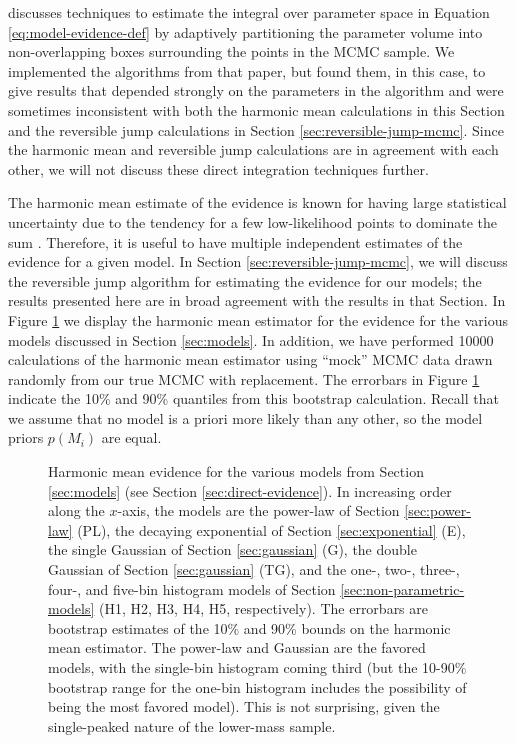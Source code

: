 \documentclass[preprint]{aastex}
\begin{document}
\citet{Weinberg2010} discusses techniques to estimate the integral
over parameter space in Equation \eqref{eq:model-evidence-def} by
adaptively partitioning the parameter volume into non-overlapping
boxes surrounding the points in the MCMC sample.  We implemented the
algorithms from that paper, but found them, in this case, to give
results that depended strongly on the parameters in the algorithm and
were sometimes inconsistent with both the harmonic mean calculations
in this Section and the reversible jump calculations in Section
\ref{sec:reversible-jump-mcmc}.  Since the harmonic mean and
reversible jump calculations are in agreement with each other, we will
not discuss these direct integration techniques further.

The harmonic mean estimate of the evidence is known for having large
statistical uncertainty due to the tendency for a few low-likelihood
points to dominate the sum \citep{Weinberg2010}.  Therefore, it is
useful to have multiple independent estimates of the evidence for a
given model.  In Section \ref{sec:reversible-jump-mcmc}, we will
discuss the reversible jump algorithm for estimating the evidence for
our models; the results presented here are in broad agreement with the
results in that Section.  In Figure \ref{fig:harmonic-evidence} we
display the harmonic mean estimator for the evidence for the various
models discussed in Section \ref{sec:models}.  In addition, we have
performed 10000 calculations of the harmonic mean estimator using
``mock'' MCMC data drawn randomly from our true MCMC with replacement.
The errorbars in Figure \ref{fig:harmonic-evidence} indicate the 10\%
and 90\% quantiles from this bootstrap calculation.  Recall that we
assume that no model is a priori more likely than any other, so the
model priors $p(M_i)$ are equal.  

\begin{figure}
  \begin{center}
  \end{center}
  \caption{\label{fig:harmonic-evidence} Harmonic mean evidence for
    the various models from Section \ref{sec:models} (see Section
    \ref{sec:direct-evidence}).  In increasing order along the
    $x$-axis, the models are the power-law of Section
    \ref{sec:power-law} (PL), the decaying exponential of Section
    \ref{sec:exponential} (E), the single Gaussian of Section
    \ref{sec:gaussian} (G), the double Gaussian of Section
    \ref{sec:gaussian} (TG), and the one-, two-, three-, four-, and
    five-bin histogram models of Section
    \ref{sec:non-parametric-models} (H1, H2, H3, H4, H5,
    respectively).  The errorbars are bootstrap estimates of the 10\%
    and 90\% bounds on the harmonic mean estimator.  The power-law and
    Gaussian are the favored models, with the single-bin histogram
    coming third (but the 10-90\% bootstrap range for the one-bin
    histogram includes the possibility of being the most favored
    model).  This is not surprising, given the single-peaked nature of
    the lower-mass sample.}
\end{figure}
\end{document}
